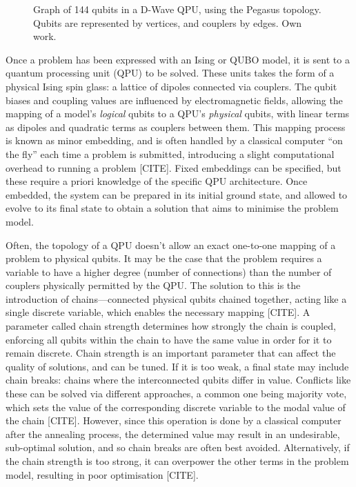 \documentclass[12pt]{article}
\theoremstyle{definition}
\begin{document}
\begin{figure}[ht]
    \centering
    
    \caption{Graph of \num{144} qubits in a D-Wave QPU, using the Pegasus topology. Qubits are represented by vertices, and couplers by edges. Own work.}
    \label{fig:pegasus}
\end{figure}

Once a problem has been expressed with an Ising or QUBO model, it is sent to a quantum processing unit (QPU) to be solved. These units takes the form of a physical Ising spin glass: a lattice of dipoles connected via couplers. The qubit biases and coupling values are influenced by electromagnetic fields, allowing the mapping of a model's \emph{logical} qubits to a QPU's \emph{physical} qubits, with linear terms as dipoles and quadratic terms as couplers between them. This mapping process is known as minor embedding, and is often handled by a classical computer ``on the fly'' each time a problem is submitted, introducing a slight computational overhead to running a problem [CITE]. Fixed embeddings can be specified, but these require a priori knowledge of the specific QPU architecture. Once embedded, the system can be prepared in its initial ground state, and allowed to evolve to its final state to obtain a solution that aims to minimise the problem model.

Often, the topology of a QPU doesn't allow an exact one-to-one mapping of a problem to physical qubits. It may be the case that the problem requires a variable to have a higher degree (number of connections) than the number of couplers physically permitted by the QPU. The solution to this is the introduction of chains---connected physical qubits chained together, acting like a single discrete variable, which enables the necessary mapping [CITE]. A parameter called chain strength determines how strongly the chain is coupled, enforcing all qubits within the chain to have the same value in order for it to remain discrete. Chain strength is an important parameter that can affect the quality of solutions, and can be tuned. If it is too weak, a final state may include chain breaks: chains where the interconnected qubits differ in value. Conflicts like these can be solved via different approaches, a common one being majority vote, which sets the value of the corresponding discrete variable to the modal value of the chain [CITE]. However, since this operation is done by a classical computer after the annealing process, the determined value may result in an undesirable, sub-optimal solution, and so chain breaks are often best avoided. Alternatively, if the chain strength is too strong, it can overpower the other terms in the problem model, resulting in poor optimisation [CITE].
\end{document}
